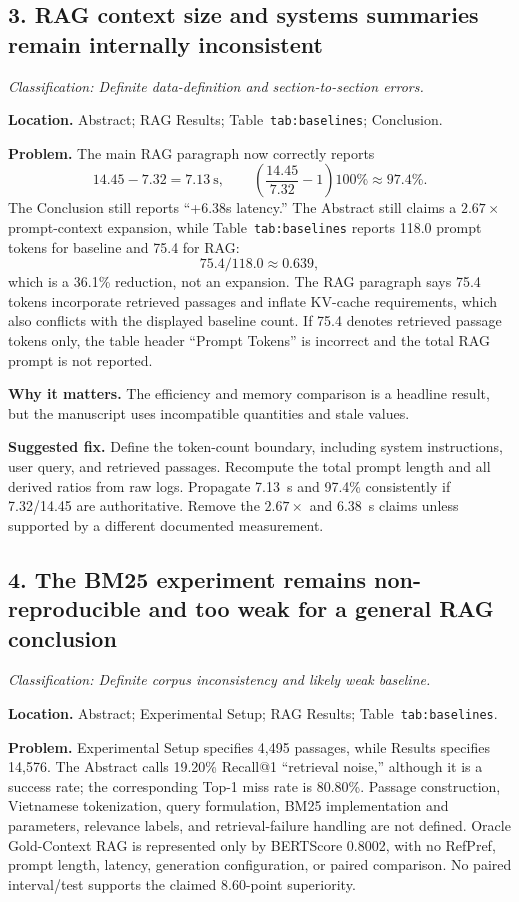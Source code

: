\documentclass[11pt]{article}
\newcommand{\findinglabel}[1]{\textbf{#1}}
\newcommand{\classification}[1]{\textit{Classification: #1.}}
\begin{document}
\subsection*{3. RAG context size and systems summaries remain internally inconsistent}

\classification{Definite data-definition and section-to-section errors}

\findinglabel{Location.} Abstract; RAG Results; Table~\texttt{tab:baselines}; Conclusion.

\findinglabel{Problem.} The main RAG paragraph now correctly reports
\[
14.45-7.32=7.13\ \text{s},
\qquad
\left(\frac{14.45}{7.32}-1\right)100\%\approx97.4\%.
\]
The Conclusion still reports ``+6.38s latency.''  The Abstract still claims a $2.67\times$ prompt-context expansion, while Table~\texttt{tab:baselines} reports 118.0 prompt tokens for baseline and 75.4 for RAG:
\[
75.4/118.0\approx0.639,
\]
which is a 36.1\% reduction, not an expansion.  The RAG paragraph says 75.4 tokens incorporate retrieved passages and inflate KV-cache requirements, which also conflicts with the displayed baseline count.  If 75.4 denotes retrieved passage tokens only, the table header ``Prompt Tokens'' is incorrect and the total RAG prompt is not reported.

\findinglabel{Why it matters.} The efficiency and memory comparison is a headline result, but the manuscript uses incompatible quantities and stale values.

\findinglabel{Suggested fix.} Define the token-count boundary, including system instructions, user query, and retrieved passages.  Recompute the total prompt length and all derived ratios from raw logs.  Propagate 7.13~s and 97.4\% consistently if 7.32/14.45 are authoritative.  Remove the $2.67\times$ and 6.38~s claims unless supported by a different documented measurement.

\subsection*{4. The BM25 experiment remains non-reproducible and too weak for a general RAG conclusion}

\classification{Definite corpus inconsistency and likely weak baseline}

\findinglabel{Location.} Abstract; Experimental Setup; RAG Results; Table~\texttt{tab:baselines}.

\findinglabel{Problem.} Experimental Setup specifies 4,495 passages, while Results specifies 14,576.  The Abstract calls 19.20\% Recall@1 ``retrieval noise,'' although it is a success rate; the corresponding Top-1 miss rate is 80.80\%.  Passage construction, Vietnamese tokenization, query formulation, BM25 implementation and parameters, relevance labels, and retrieval-failure handling are not defined.  Oracle Gold-Context RAG is represented only by BERTScore 0.8002, with no RefPref, prompt length, latency, generation configuration, or paired comparison.  No paired interval/test supports the claimed 8.60-point superiority.
\end{document}
